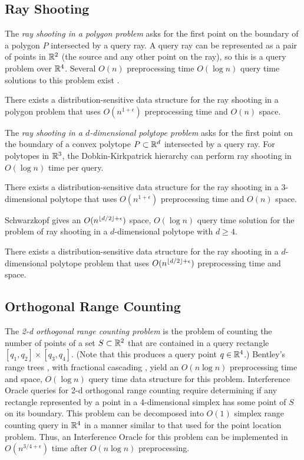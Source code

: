 \documentclass{patmorin}
\begin{document}
\subsection{Ray Shooting}

The \emph{ray shooting in a polygon problem} asks for the first point
on the boundary of a polygon $P$ intersected by a query ray.  A query
ray can be represented as a pair of points in $\mathbb{R}^2$ (the source and
any other point on the ray), so this is a query problem over $\mathbb{R}^4$.
Several $O(n)$ preprocessing time $O(\log n)$ query time solutions to
this problem exist \cite{cegghss94,hs95}.

\begin{thm}
  There exists a distribution-sensitive data structure for the ray shooting
  in a polygon problem that uses $O(n^{1+\epsilon})$ preprocessing time and
  $O(n)$ space.
\end{thm}

The \emph{ray shooting in a $d$-dimensional polytope problem}
asks for the first point on the boundary of a convex polytope
$P\subset\mathbb{R}^d$ intersected by a query ray.  For polytopes in $\mathbb{R}^3$,
the Dobkin-Kirkpatrick hierarchy \cite{dk83} can perform ray shooting
in $O(\log n)$ time per query.

\begin{thm}
  There exists a distribution-sensitive data structure for
  the ray shooting in a $3$-dimensional polytope that uses
  $O(n^{1+\epsilon})$ preprocessing time and $O(n)$ space.
\end{thm}

Schwarzkopf \cite{s92} gives an $O(n^{{\left\lfloor d/2 \right\rfloor}+\epsilon})$ space,
$O(\log n)$ query time solution for the problem of ray shooting in a
$d$-dimensional polytope with $d \ge 4$.

\begin{thm}
  There exists a distribution-sensitive data structure for the
  ray shooting in a $d$-dimensional polytope problem that uses
  $O(n^{{\left\lfloor d/2 \right\rfloor}+\epsilon})$ preprocessing time and space.
\end{thm}

\subsection{Orthogonal Range Counting}

The \emph{2-d orthogonal range counting problem} is the problem of
counting the number of points of a set $S\subset\mathbb{R}^2$ that are contained
in a query rectangle $[q_1,q_2]\times[q_3,q_4]$. (Note that this
produces a query point $q\in \mathbb{R}^4$.) Bentley's range trees \cite{b75},
with fractional cascading \cite{cg86,l78}, yield an $O(n\log n)$
preprocessing time and space, $O(\log n)$ query time data structure
for this problem.  Interference Oracle queries for 2-d orthogonal
range counting require determining if any rectangle represented by a
point in a 4-dimensional simplex has some point of $S$ on its boundary.
This problem can be decomposed into $O(1)$ simplex range counting query in
$\mathbb{R}^4$ in a manner similar to that used for the point location problem.
Thus, an Interference Oracle for this problem can be implemented in
$O(n^{3/4+\epsilon})$ time after $O(n\log n)$ preprocessing.
\end{document}
